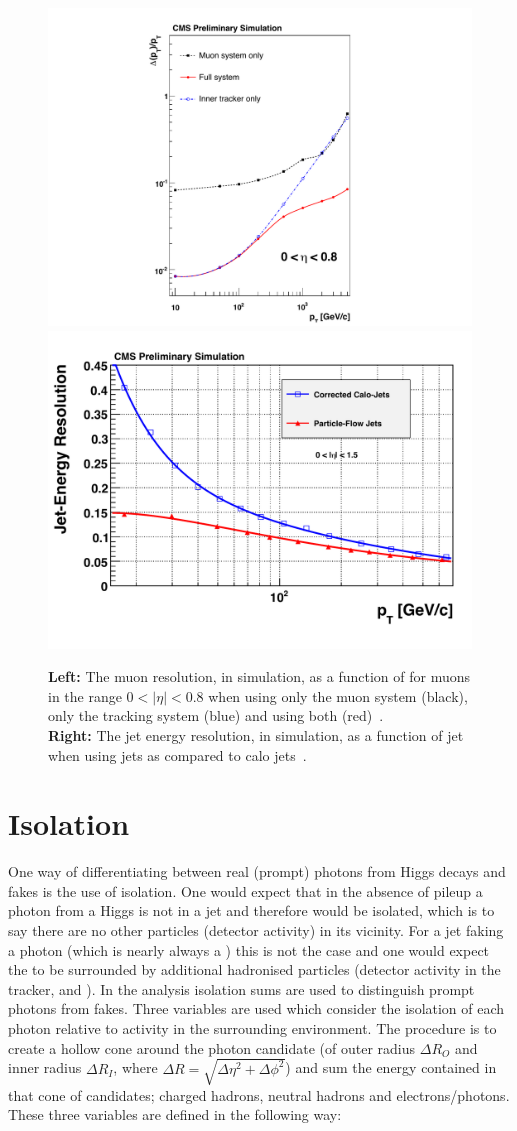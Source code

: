 \begin{figure}
  \includegraphics[height=0.4\textwidth]{cms_experiment/plots/MuonResolution_fix.pdf}
  \includegraphics[height=0.4\textwidth]{cms_experiment/plots/BarrelResolutionPFAndCalo_fix.pdf}
  \caption[Particle flow jet resolution]{\textbf{Left:} The muon \pT resolution, in \MC simulation, as a function of \pT for muons in the range $0<|\eta|<0.8$ when using only the muon system (black), only the tracking system (blue) and using both (red)~\cite{CMS_JINST}. \\ \textbf{Right:} The jet energy resolution, in \MC simulation, as a function of jet \pT when using \PF jets as compared to calo jets~\cite{cms_pf_performance}.}
  \label{fig:muon_jet_res}
\end{figure}

\section{Isolation}
\label{sec:iso}

One way of differentiating between real (prompt) photons from Higgs decays and fakes is the use of isolation. One would expect that in the absence of pileup a photon from a Higgs is not in a jet and therefore would be isolated, which is to say there are no other particles (detector activity) in its vicinity. For a jet faking a photon (which is nearly always a \pizero) this is not the case and one would expect the \pizero to be surrounded by additional hadronised particles (detector activity in the tracker, \ECAL and \HCAL). In the \CMS \Hgg analysis isolation sums are used to distinguish prompt photons from fakes. Three variables are used which consider the isolation of each photon relative to activity in the surrounding environment. The procedure is to create a hollow cone around the photon candidate (of outer radius $\Delta R_{O}$ and inner radius $\Delta R_{I}$, where $\Delta R = \sqrt{\Delta\eta^{2}+\Delta\phi^{2}}$) and sum the energy contained in that cone of \PF candidates; charged hadrons, neutral hadrons and electrons/photons. These three variables are defined in the following way:

